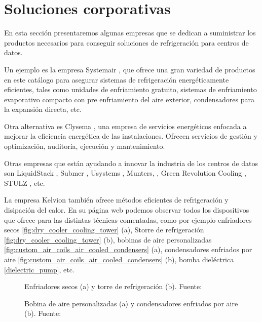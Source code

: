 \section{Soluciones corporativas} \label{empresas}

En esta sección presentaremos algunas empresas que se dedican a suministrar los productos necesarios para conseguir soluciones de refrigeración para centros de datos.

Un ejemplo es la empresa Systemair \cite{systemair}, que ofrece una gran variedad de productos en este catálogo para asegurar sistemas de refrigeración energéticamente eficientes, tales como unidades de enfriamiento gratuito, sistemas de enfriamiento evaporativo compacto con pre enfriamiento del aire exterior, condensadores para la expansión directa, etc.

Otra alternativa es Clysema \cite{clysema}, una empresa de servicios energéticos enfocada a mejorar la eficiencia energética de las instalaciones. Ofrecen servicios de gestión y optimización, auditoría, ejecución y mantenimiento.

Otras empresas que están ayudando a innovar la industria de los centros de datos son LiquidStack \cite{liquidstack}, Submer \cite{submer}, Usystems \cite{usystems}, Munters, \cite{munters}, Green Revolution Cooling \cite{GRC}, STULZ \cite{stulz}, etc.

La empresa Kelvion \cite{Kelvion} también ofrece métodos eficientes de refrigeración y disipación del calor. En su página web podemos observar todos los dispositivos que ofrece para las distintas técnicas comentadas, como por ejemplo enfriadores secos \eqref{fig:dry_cooler_cooling_tower} (a), Storre de refrigeración \eqref{fig:dry_cooler_cooling_tower} (b), bobinas de aire personalizadas \eqref{fig:custom_air_coils_air_cooled_condensers} (a), condensadores enfriados por aire \eqref{fig:custom_air_coils_air_cooled_condensers} (b), bomba dieléctrica \eqref{dielectric_pump}, etc.

\begin{figure}%
    \centering
    \qquad
    \caption{Enfriadores secos (a) y torre de refrigeración (b). Fuente: \cite{Kelvion}}%
    \label{fig:dry_cooler_cooling_tower}%
\end{figure}

\begin{figure}%
    \centering
    \qquad
    \caption{Bobina de aire personalizadas (a) y condensadores enfriados por aire (b). Fuente: \cite{Kelvion}}%
    \label{fig:custom_air_coils_air_cooled_condensers}%
\end{figure}

